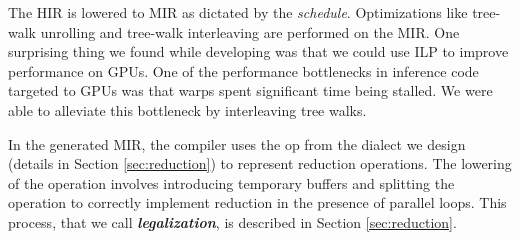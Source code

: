 The HIR is lowered to MIR as dictated by the \emph{schedule}.
Optimizations like tree-walk unrolling and tree-walk interleaving
are performed on the MIR. 
One surprising thing we found while developing \Treebeard{} was that 
we could use ILP to improve performance on GPUs. 
One of the performance bottlenecks in inference code targeted 
to GPUs was that warps spent significant time being stalled. We were able to 
alleviate this bottleneck by interleaving tree walks. 

In the generated MIR, the compiler uses the  op from 
the  dialect we design (details in Section \ref{sec:reduction})
to represent reduction operations. The lowering of the  operation 
involves introducing temporary buffers and splitting the operation  
to correctly implement reduction in the presence of 
parallel loops. This process, that we call \textbf{\emph{legalization}}, is 
described in Section \ref{sec:reduction}. 


